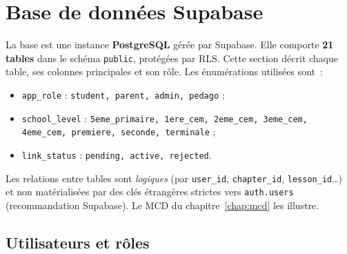 \chapter{Base de données Supabase}

La base est une instance \textbf{PostgreSQL} gérée par Supabase. Elle comporte
\textbf{21 tables} dans le schéma \texttt{public}, protégées par RLS. Cette
section décrit chaque table, ses colonnes principales et son rôle. Les
énumérations utilisées sont~:
\begin{itemize}
  \item \texttt{app\_role} : \texttt{student, parent, admin, pedago} ;
  \item \texttt{school\_level} : \texttt{5eme\_primaire, 1ere\_cem, 2eme\_cem,
        3eme\_cem, 4eme\_cem, premiere, seconde, terminale} ;
  \item \texttt{link\_status} : \texttt{pending, active, rejected}.
\end{itemize}

\begin{notebox}
Les relations entre tables sont \emph{logiques} (par \texttt{user\_id},
\texttt{chapter\_id}, \texttt{lesson\_id}\dots) et non matérialisées par des clés
étrangères strictes vers \texttt{auth.users} (recommandation Supabase). Le MCD du
chapitre~\ref{chap:mcd} les illustre.
\end{notebox}

\newcommand{\dbtable}[2]{%
\subsection{\texttt{#1}}%
\emph{#2}%
}

\section{Utilisateurs et rôles}

